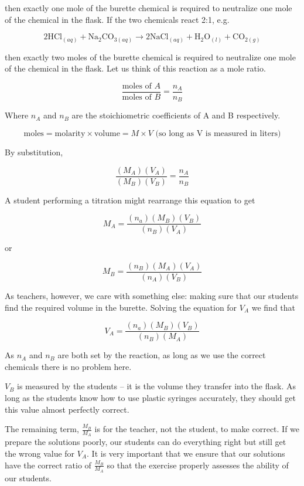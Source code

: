 then exactly one mole of the burette chemical is required to neutralize one mole of the chemical in the flask. If the two chemicals react 2:1, e.g. 

\[ 2\mathrm{HCl}_{(aq)} + \mathrm{Na}_{2}\mathrm{CO}_{3(aq)} \longrightarrow 2\mathrm{NaCl}_{(aq)} + \mathrm{H}_{2}\mathrm{O}_{(l)} + \mathrm{CO}_{2(g)} \]

then exactly two moles of the burette chemical is required to neutralize one mole of the chemical in the flask. Let us think of this reaction as a mole ratio.

\[ \frac{\mbox{moles of }A}{\mbox{moles of }B} = \frac{n_{A}}{n_{B}} \]

Where $ n_{A} $ and $ n_{B} $ are the stoichiometric coefficients of A and B respectively.

\[ \mathrm{moles} = \mathrm{molarity} \times \mathrm{volume} = M \times V \mbox{ (so long as V is measured in liters)} \]

By substitution,

\[ \frac{(M_{A})(V_{A})}{(M_{B})(V_{B})} = \frac{n_{A}}{n_{B}} \]

A student performing a titration might rearrange this equation to get

\[ M_{A} = \frac{(n_{a})(M_{B})(V_{B})}{(n_{B})(V_{A})} \]

or

\[ M_{B} = \frac{(n_{B})(M_{A})(V_{A})}{(n_{A})(V_{B})} \]

As teachers, however, we care with something else: making sure that our students find the required volume in the burette. Solving the equation for $ V_{A} $ we find that

\[ V_{A} = \frac{(n_{a})(M_{B})(V_{B})}{(n_{B})(M_{A})} \]

As $ n_{A} $ and $ n_{B} $ are both set by the reaction, as long as we use the correct chemicals there is no problem here.

$ V_{B} $ is measured by the students -- it is the volume they transfer into the flask. As long as the students know how to use plastic syringes accurately, they should get this value almost perfectly correct.

The remaining term, $ \frac{M_{B}}{M_{A}} $ is for the teacher, not the student, to make correct. If we prepare the solutions poorly, our students can do everything right but still get the wrong value for $ V_{A} $. It is very important that we ensure that our solutions have the correct ratio of $ \frac{M_{B}}{M_{A}} $ so that the exercise properly assesses the ability of our students.

